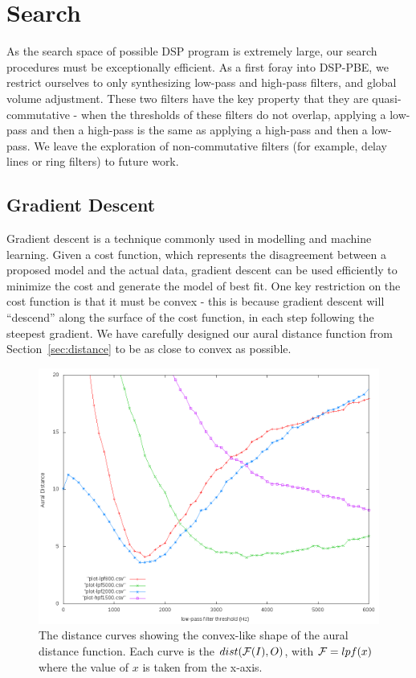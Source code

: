 \section{Search}
\label{sec:search}

As the search space of possible DSP program is extremely large, our search procedures must be exceptionally efficient. 
As a first foray into DSP-PBE, we restrict ourselves to only synthesizing low-pass and high-pass filters, and global volume adjustment.
These two filters have the key property that they are quasi-commutative - when the thresholds of these filters do not overlap, applying a low-pass and then a high-pass is the same as applying a high-pass and then a low-pass.
We leave the exploration of non-commutative filters (for example, delay lines or ring filters) to future work.

\subsection{Gradient Descent}

Gradient descent is a technique commonly used in modelling and machine learning.
Given a cost function, which represents the disagreement between a proposed model and the actual data, gradient descent can be used efficiently to minimize the cost and generate the model of best fit.
One key restriction on the cost function is that it must be convex - this is because gradient descent will ``descend'' along the surface of the cost function, in each step following the steepest gradient.
We have carefully designed our aural distance function from Section~\ref{sec:distance} to be as close to convex as possible.

\begin{figure}[!h]
\includegraphics[width=\columnwidth]{figs/distCurves} 
\caption{The distance curves showing the convex-like shape of the aural distance function. Each curve is the $dist(\mathcal{F}(I),O)$, with $\mathcal{F} = lpf(x)$ where the value of $x$ is taken from the x-axis.}
\label{fig:distCurves}
\end{figure}

